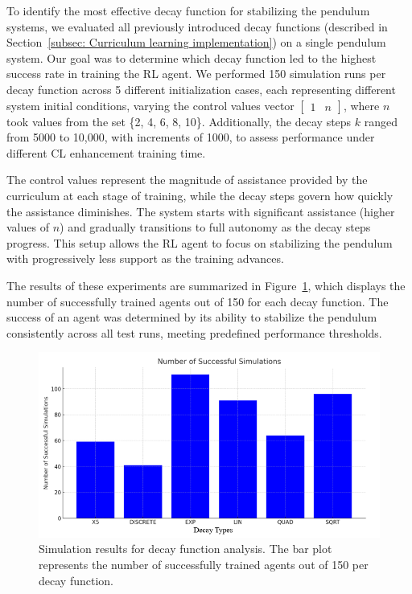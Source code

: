 To identify the most effective decay function for stabilizing the pendulum systems, we evaluated all previously introduced decay functions (described in Section~\ref{subsec: Curriculum learning implementation}) on a single pendulum system. Our goal was to determine which decay function led to the highest success rate in training the RL agent. We performed 150 simulation runs per decay function across 5 different initialization cases, each representing different system initial conditions, varying the control values vector \(\begin{bmatrix} 1 & n \end{bmatrix}\), where $n$ took values from the set \{2, 4, 6, 8, 10\}. Additionally, the decay steps $k$ ranged from 5000 to 10,000, with increments of 1000, to assess performance under different CL enhancement training time.

The control values represent the magnitude of assistance provided by the curriculum at each stage of training, while the decay steps govern how quickly the assistance diminishes. The system starts with significant assistance (higher values of $n$) and gradually transitions to full autonomy as the decay steps progress. This setup allows the RL agent to focus on stabilizing the pendulum with progressively less support as the training advances.

The results of these experiments are summarized in Figure~\ref{fig: decay types comparison}, which displays the number of successfully trained agents out of 150 for each decay function. The success of an agent was determined by its ability to stabilize the pendulum consistently across all test runs, meeting predefined performance thresholds.

\begin{figure}[h]
	\centering
	\includegraphics[width=12cm]{Figures/decay_types_results_comparison.png}
	\caption{Simulation results for decay function analysis. The bar plot represents the number of successfully trained agents out of 150 per decay function.}
	\label{fig: decay types comparison}
\end{figure}

